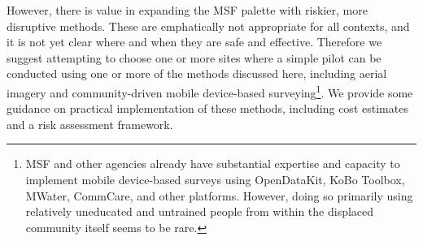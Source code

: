 \documentclass[a4paper,12pt,twoside]{article}
\begin{document}
\begin{multicols}{2}
However, there is value in expanding the MSF palette with riskier, more disruptive methods. These are emphatically not appropriate for all contexts, and it is not yet clear where and when they are safe and effective. Therefore we suggest attempting to choose one or more sites where a simple pilot can be conducted using one or more of the methods discussed here, including aerial imagery and community-driven mobile device-based surveying\footnote{MSF and other agencies already have substantial expertise and capacity to implement mobile device-based surveys using OpenDataKit, KoBo Toolbox, MWater, CommCare, and other platforms. However, doing so primarily using relatively uneducated and untrained people from within the displaced community itself seems to be rare.}. We provide some guidance on practical implementation of these methods, including cost estimates and a risk assessment framework.

\end{multicols}

\newpage
\end{document}
